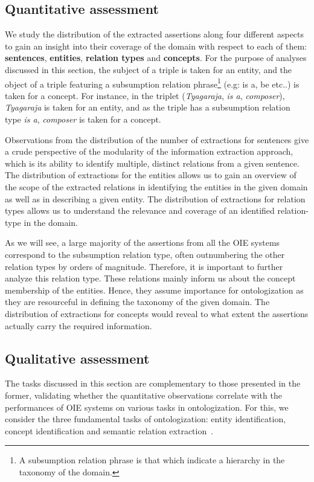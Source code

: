 \documentclass{llncs}
\begin{document}
\subsection{Quantitative assessment}
We study the distribution of the extracted assertions along four different aspects to gain an insight into their coverage of the domain with respect to each of them: \textbf{sentences}, \textbf{entities}, \textbf{relation types} and \textbf{concepts}. For the purpose of analyses discussed in this section, the subject of a triple is taken for an entity, and the object of a triple featuring a subsumption relation phrase\footnote{A subsumption relation phrase is that which indicate a hierarchy in the taxonomy of the domain.} (e.g: is a, be etc..) is taken for a concept. For instance, in the triplet (\textit{Tyagaraja}, \textit{is a}, \textit{composer}), \textit{Tyagaraja} is taken for an entity, and as the triple has a subsumption relation type \textit{is a}, \textit{composer} is taken for a concept.

Observations from the distribution of the number of extractions for sentences give a crude perspective of the modularity of the information extraction approach, which is its ability to identify multiple, distinct relations from a given sentence. The distribution of extractions for the entities allows us to gain an overview of the scope of the extracted relations in identifying the entities in the given domain as well as in describing a given entity. The distribution of extractions for relation types allows us to understand the relevance and coverage of an identified relation-type in the domain. 

As we will see, a large majority of the assertions from all the OIE systems correspond to the subsumption relation type, often outnumbering the other relation types by orders of magnitude. Therefore, it is important to further analyze this relation type. These relations mainly inform us about the concept membership of the entities. Hence, they assume importance for ontologization as they are resourceful in defining the taxonomy of the given domain. The distribution of extractions for concepts would reveal to what extent the assertions actually carry the required information.

\subsection{Qualitative assessment}
The tasks discussed in this section are complementary to those presented in the former, validating whether the quantitative observations correlate with the performances of OIE systems on various tasks in ontologization. For this, we consider the three fundamental tasks of ontologization: entity identification, concept identification and semantic relation extraction~\cite{Petasis2011}. 
\end{document}
